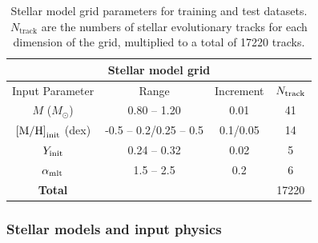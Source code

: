 \documentclass[a4paper,fleqn,usenatbib]{mnras}
\begin{document}
\begin{table}
	\centering
	\caption{Stellar model grid parameters for training and test datasets. $N_\mathrm{track}$ are the numbers of stellar evolutionary tracks for each dimension of the grid, multiplied to a total of \num{17220} tracks.}
	\label{tab:grid}
	\begin{tabular}{cccc} %
		\toprule
		\multicolumn{4}{c}{\textbf{Stellar model grid}}\\
		\midrule
		Input Parameter & Range & Increment & $N_{\rm track}$\\
        \midrule
	$M$ ($M_{\odot}$)  & 0.80 -- 1.20 &  0.01& \num{41}\\
        $\rm{[M/H]}_\mathrm{init}$ (dex) & -0.5 -- 0.2/0.25 -- 0.5 & 0.1/0.05 & \num{14}\\
        	$Y_{\rm init}$ & 0.24 -- 0.32 & 0.02 & \num{5}\\
        $\alpha_{\rm{mlt}}$  & 1.5 -- 2.5&  0.2 & \num{6}\\
        \midrule
        \textbf{Total} & & & \num{17220}\\
        \bottomrule
	\end{tabular}
\end{table}

\subsubsection{Stellar models and input physics}\label{subsec:stellar_model}
\end{document}

